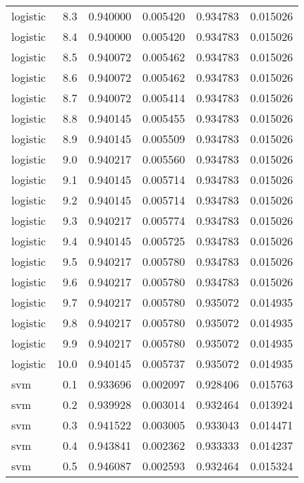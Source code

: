 \begin{tabular}{lrrrrr}
logistic &        8.3 &    0.940000 &   0.005420 &   0.934783 &  0.015026 \\
logistic &        8.4 &    0.940000 &   0.005420 &   0.934783 &  0.015026 \\
logistic &        8.5 &    0.940072 &   0.005462 &   0.934783 &  0.015026 \\
logistic &        8.6 &    0.940072 &   0.005462 &   0.934783 &  0.015026 \\
logistic &        8.7 &    0.940072 &   0.005414 &   0.934783 &  0.015026 \\
logistic &        8.8 &    0.940145 &   0.005455 &   0.934783 &  0.015026 \\
logistic &        8.9 &    0.940145 &   0.005509 &   0.934783 &  0.015026 \\
logistic &        9.0 &    0.940217 &   0.005560 &   0.934783 &  0.015026 \\
logistic &        9.1 &    0.940145 &   0.005714 &   0.934783 &  0.015026 \\
logistic &        9.2 &    0.940145 &   0.005714 &   0.934783 &  0.015026 \\
logistic &        9.3 &    0.940217 &   0.005774 &   0.934783 &  0.015026 \\
logistic &        9.4 &    0.940145 &   0.005725 &   0.934783 &  0.015026 \\
logistic &        9.5 &    0.940217 &   0.005780 &   0.934783 &  0.015026 \\
logistic &        9.6 &    0.940217 &   0.005780 &   0.934783 &  0.015026 \\
logistic &        9.7 &    0.940217 &   0.005780 &   0.935072 &  0.014935 \\
logistic &        9.8 &    0.940217 &   0.005780 &   0.935072 &  0.014935 \\
logistic &        9.9 &    0.940217 &   0.005780 &   0.935072 &  0.014935 \\
logistic &       10.0 &    0.940145 &   0.005737 &   0.935072 &  0.014935 \\
     svm &        0.1 &    0.933696 &   0.002097 &   0.928406 &  0.015763 \\
     svm &        0.2 &    0.939928 &   0.003014 &   0.932464 &  0.013924 \\
     svm &        0.3 &    0.941522 &   0.003005 &   0.933043 &  0.014471 \\
     svm &        0.4 &    0.943841 &   0.002362 &   0.933333 &  0.014237 \\
     svm &        0.5 &    0.946087 &   0.002593 &   0.932464 &  0.015324 \\

\end{tabular}
